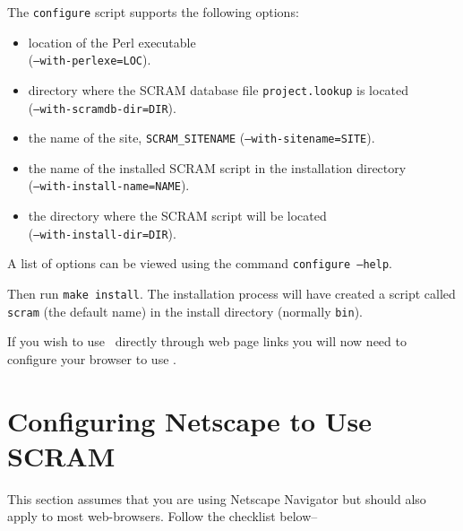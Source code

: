 \begin{enumerate}
  The \texttt{configure} script supports the following options:
  
  \begin{itemize}
  \item location of the Perl executable\mbox{}\\ 
    (\texttt{--with-perlexe=LOC}).
    
  \item directory where the SCRAM database file \texttt{project.lookup}
    is located\mbox{}\\ (\texttt{--with-scramdb-dir=DIR}).
    
  \item the name of the site, 
    \texttt{SCRAM\_SITENAME} (\texttt{--with-sitename=SITE}).
    
  \item the name of the installed SCRAM script in the installation directory\mbox{}\\ 
    (\texttt{--with-install-name=NAME}).
    
  \item the directory where the SCRAM script will be located\mbox{}\\
    (\texttt{--with-install-dir=DIR}).
    
  \end{itemize} 
  A list of options can be viewed using the command \texttt{configure --help}.
\end{enumerate}

\ni Then run \texttt{make}~\texttt{install}.
The installation process will have created a script called
\texttt{scram} (the default name) in the install directory (normally \texttt{bin}).

\ni If you wish to use \scram\ directly through web page links you will
now need to configure your browser to use \scram.

\section{Configuring Netscape to Use SCRAM}\label{sec:webbootstrap}
This section assumes that you are using Netscape Navigator but should
also apply to most web-browsers. Follow the checklist below--

